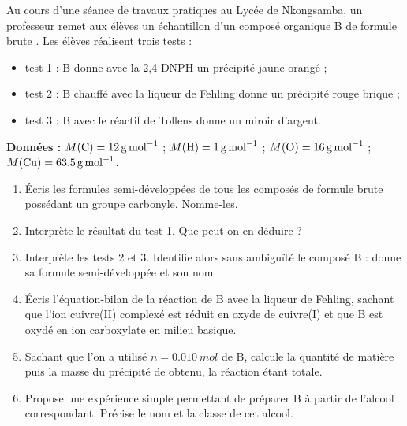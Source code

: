 \documentclass[11pt]{article}
\begin{document}
\begin{exercice}
Au cours d'une séance de travaux pratiques au Lycée de Nkongsamba, un professeur remet aux élèves un échantillon d'un composé organique B de formule brute . Les élèves réalisent trois tests :
\begin{itemize}
\item test 1 : B donne avec la 2,4-DNPH un précipité jaune-orangé ;
\item test 2 : B chauffé avec la liqueur de Fehling donne un précipité rouge brique ;
\item test 3 : B avec le réactif de Tollens donne un miroir d'argent.
\end{itemize}

\textbf{Données :} $M(\ce{C}) = \SI{12}{g.mol^{-1}}$ ; $M(\ce{H}) = \SI{1}{g.mol^{-1}}$ ; $M(\ce{O}) = \SI{16}{g.mol^{-1}}$ ; $M(\ce{Cu}) = \SI{63,5}{g.mol^{-1}}$.
\begin{enumerate}
\item Écris les formules semi-développées de tous les composés de formule brute  possédant un groupe carbonyle. Nomme-les.
\item Interprète le résultat du test 1. Que peut-on en déduire ?
\item Interprète les tests 2 et 3. Identifie alors sans ambiguïté le composé B : donne sa formule semi-développée et son nom.
\item Écris l'équation-bilan de la réaction de B avec la liqueur de Fehling, sachant que l'ion cuivre(II) complexé  est réduit en oxyde de cuivre(I)  et que B est oxydé en ion carboxylate  en milieu basique.
\item Sachant que l'on a utilisé $n = \SI{0,010}{mol}$ de B, calcule la quantité de matière puis la masse du précipité de  obtenu, la réaction étant totale.
\item Propose une expérience simple permettant de préparer B à partir de l'alcool correspondant. Précise le nom et la classe de cet alcool.
\end{enumerate}
\end{exercice}
\end{document}
